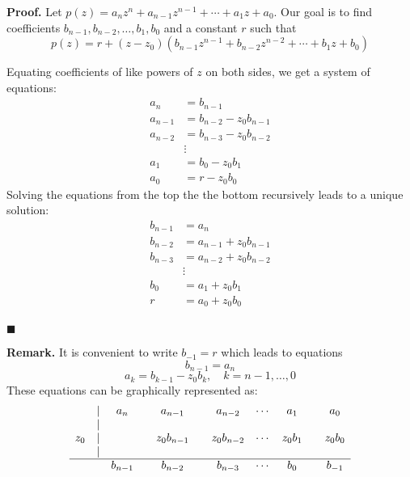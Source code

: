\documentclass[main.tex]{subfiles}
\begin{document}
\par \noindent \textbf{Proof. } Let $p(z) = a_n z^n + a_{n-1} z^{n-1} + \cdots + a_1 z + a_0$. Our goal is to find coefficients $b_{n-1}, b_{n-2}, \ldots, b_1, b_0$ and a constant $r$ such that 
\[
    p(z) = r + (z - z_0)(b_{n-1} z^{n-1} + b_{n-2} z^{n-2} + \cdots + b_1 z + b_0)
\]
\par Equating coefficients of like powers of $z$ on both sides, we get a system of equations:
\begin{align*}
    a_n &= b_{n-1} \\
    a_{n-1} &= b_{n-2} - z_0 b_{n-1} \\
    a_{n-2} &= b_{n-3} - z_0 b_{n-2} \\
    &\vdots \\
    a_1 &= b_0 - z_0 b_1 \\
    a_0 &= r - z_0 b_0
\end{align*}
Solving the equations from the top the the bottom recursively leads to a unique solution: 
\begin{align*}
    b_{n-1} &= a_n \\
    b_{n-2} &= a_{n-1} + z_0 b_{n-1} \\
    b_{n-3} &= a_{n-2} + z_0 b_{n-2} \\
    &\vdots \\
    b_0 &= a_1 + z_0 b_1 \\
    r &= a_0 + z_0 b_0
\end{align*}
\\ \null \hfill $\blacksquare$ 

\par \noindent \textbf{Remark. } It is convenient to write $b_{-1} = r$ which leads to equations 
\[
    b_{n - 1} = a_n
\]
\[
    a_k = b_{k-1} - z_0 b_k, \quad k = n-1, \ldots, 0
\]
These equations can be graphically represented as: 
\[
    \begin{array}{ccccccccccc}
        \null &  |  & a_n &     & a_{n-1} &     & a_{n-2} & \cdots & a_1 &     & a_0 \\
        \null &  |  & \null &         & \null &         &        &     & \null &     \\
        z_0&  |  &    &     & z_0 b_{n-1} &     & z_0 b_{n-2} & \cdots & z_0 b_1 &     & z_0 b_0 \\
        \null &  |  & \null &         & \null &         &        &     & \null &     \\
        \hline 
        \null &    &b_{n-1} &     & b_{n-2} &     & b_{n-3} & \cdots & b_0 &     & b_{-1} \\
    \end{array}
\]
\end{document}
